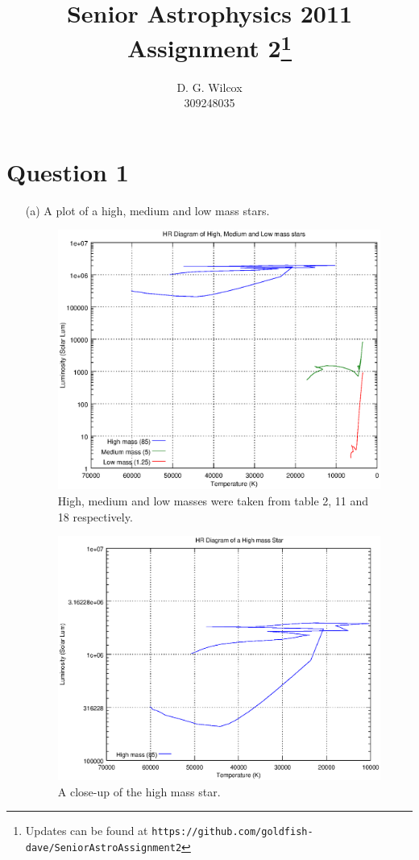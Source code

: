 \documentclass[10pt,a4paper]{article}
\title{Senior Astrophysics 2011 Assignment 2\footnote{Updates can be found at \texttt{https://github.com/goldfish-dave/SeniorAstroAssignment2}}}
\date{}
\author{D. G. Wilcox \\
		309248035}
\begin{document}
\maketitle

\section*{Question 1}
\begin{itemize}
    \item[(a)] A plot of a high, medium and low mass stars.
    \begin{figure}[h]
        \includegraphics[width=0.8\linewidth]{high-mid-low-HR.eps}
        \caption{High, medium and low masses were taken from table 2, 11 and 18 respectively.}
    \end{figure}
    \begin{figure}[h!]
        \includegraphics[width=0.8\linewidth]{high-only-HR.eps}
        \caption{A close-up of the high mass star.}

\end{figure}
\end{itemize}
\end{document}
